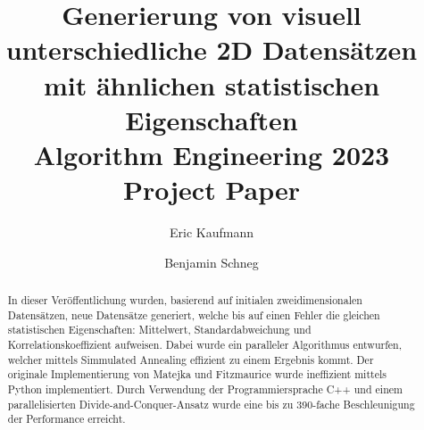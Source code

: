 \documentclass[sigconf]{acmart}
\begin{document}
\title[Generierung von visuell unterschiedlichen 2D Datensätzen mit ähnlichen statistischen Eigenschaften ]{Generierung von visuell unterschiedliche 2D Datensätzen mit ähnlichen statistischen Eigenschaften\\\large Algorithm Engineering 2023 Project Paper}


\author{Eric Kaufmann}

\author{Benjamin Schneg}

\begin{abstract}


In dieser Veröffentlichung wurden, basierend auf initialen zweidimensionalen Datensätzen, neue Datensätze generiert, welche bis auf einen Fehler die gleichen statistischen Eigenschaften: Mittelwert, Standardabweichung und Korrelationskoeffizient aufweisen. Dabei wurde ein paralleler Algorithmus entwurfen, welcher mittels Simmulated Annealing effizient zu einem Ergebnis kommt. Der originale Implementierung von Matejka und Fitzmaurice \cite{matejka2017same} wurde ineffizient mittels Python implementiert. Durch Verwendung der Programmiersprache C++ und einem parallelisierten Divide-and-Conquer-Ansatz wurde eine bis zu 390-fache Beschleunigung der Performance erreicht. 


\end{abstract}
\end{document}

